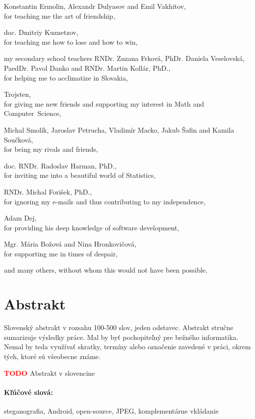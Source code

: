 \documentclass[12pt, oneside]{book}
\def\TODO{\textbf{\textcolor{red}{TODO }}}
\def\ack#1#2{#1,\\#2\smallskip}
\begin{document}
\ack{Konstantin Ermolin, Alexandr Dulyasov and Emil Vakhitov}{for teaching me the art of friendship,}

\ack{doc. Dmitriy Kuznetzov}{for teaching me how to lose and how to win,}

\ack{my secondary school teachers RNDr. Zuzana Frková, PhDr. Daniela Veselovská, PaedDr. Pavol Danko and RNDr. Martin Kollár, PhD.}
{for helping me to acclimatize in Slovakia,}

\ack{Trojsten}{for giving me new friends and supporting my interest in Math and Computer~Science,}

\ack{Michal Smolík, Jaroslav Petrucha, Vladimír Macko, Jakub Šafin and Kamila Součková}{for being
my rivals and friends,}

\ack{doc. RNDr. Radoslav Harman, PhD.}{for inviting me into a beautiful world of Statistics,}

\ack{RNDr. Michal Forišek, PhD.}{for ignoring my e-mails and thus contributing to my independence,}

\ack{Adam Dej}{for providing his deep knowledge of software development,}

\ack{Mgr. Mária Božová and Nina Hronkovičová}{for supporting me in times of despair,}

and many others, without whom this would not have been possible.

\vfill


\newpage 
\section*{Abstrakt}


Slovenský abstrakt v rozsahu 100-500 slov, jeden odstavec. Abstrakt
stručne sumarizuje výsledky práce. Mal by byť pochopiteľný pre bežného
informatika. Nemal by teda využívať skratky, termíny alebo označenie
zavedené v práci, okrem tých, ktoré sú všeobecne známe.

\TODO Abstrakt v slovencine

\paragraph*{Kľúčové slová:} steganografia, Android, open-source, JPEG, komplementárne vkládanie 
\end{document}
